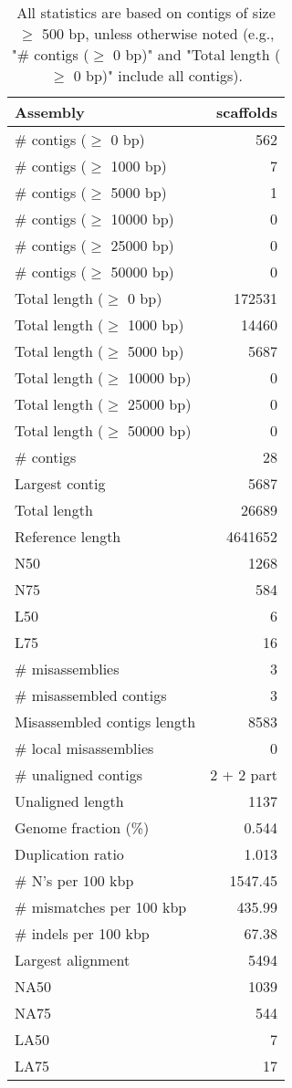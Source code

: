 \documentclass[12pt,a4paper]{article}
\begin{document}
\begin{table}[ht]
\begin{center}
\caption{All statistics are based on contigs of size $\geq$ 500 bp, unless otherwise noted (e.g., "\# contigs ($\geq$ 0 bp)" and "Total length ($\geq$ 0 bp)" include all contigs).}
\begin{tabular}{|l*{1}{|r}|}
\hline
Assembly & scaffolds \\ \hline
\# contigs ($\geq$ 0 bp) & 562 \\ \hline
\# contigs ($\geq$ 1000 bp) & 7 \\ \hline
\# contigs ($\geq$ 5000 bp) & 1 \\ \hline
\# contigs ($\geq$ 10000 bp) & 0 \\ \hline
\# contigs ($\geq$ 25000 bp) & 0 \\ \hline
\# contigs ($\geq$ 50000 bp) & 0 \\ \hline
Total length ($\geq$ 0 bp) & 172531 \\ \hline
Total length ($\geq$ 1000 bp) & 14460 \\ \hline
Total length ($\geq$ 5000 bp) & 5687 \\ \hline
Total length ($\geq$ 10000 bp) & 0 \\ \hline
Total length ($\geq$ 25000 bp) & 0 \\ \hline
Total length ($\geq$ 50000 bp) & 0 \\ \hline
\# contigs & 28 \\ \hline
Largest contig & 5687 \\ \hline
Total length & 26689 \\ \hline
Reference length & 4641652 \\ \hline
N50 & 1268 \\ \hline
N75 & 584 \\ \hline
L50 & 6 \\ \hline
L75 & 16 \\ \hline
\# misassemblies & 3 \\ \hline
\# misassembled contigs & 3 \\ \hline
Misassembled contigs length & 8583 \\ \hline
\# local misassemblies & 0 \\ \hline
\# unaligned contigs & 2 + 2 part \\ \hline
Unaligned length & 1137 \\ \hline
Genome fraction (\%) & 0.544 \\ \hline
Duplication ratio & 1.013 \\ \hline
\# N's per 100 kbp & 1547.45 \\ \hline
\# mismatches per 100 kbp & 435.99 \\ \hline
\# indels per 100 kbp & 67.38 \\ \hline
Largest alignment & 5494 \\ \hline
NA50 & 1039 \\ \hline
NA75 & 544 \\ \hline
LA50 & 7 \\ \hline
LA75 & 17 \\ \hline
\end{tabular}
\end{center}
\end{table}
\end{document}

